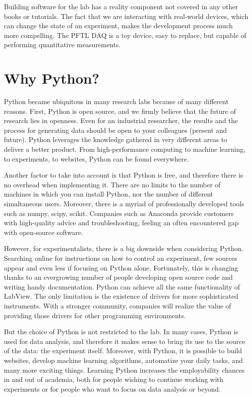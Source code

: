 Building software for the lab has a reality component not covered in any other books or tutorials. The fact that we are interacting with real-world devices, which can change the state of an experiment, makes the development process much more compelling. The PFTL DAQ is a toy device, easy to replace, but capable of performing quantitative measurements.

\section{Why Python?}\label{sec:why-python?}
Python became ubiquitous in many research labs because of many different reasons. First, Python is open source, and we firmly believe that the future of research lies in openness. Even for an industrial researcher, the results and the process for generating data should be open to your colleagues (present and future). Python leverages the knowledge gathered in very different areas to deliver a better product. From high-performance computing to machine learning, to experiments, to websites, Python can be found everywhere.

Another factor to take into account is that Python is free, and therefore there is no overhead when implementing it. There are no limits to the number of machines in which you can install Python, nor the number of different simultaneous users. Moreover, there is a myriad of professionally developed tools such as numpy, scipy, scikit. Companies such as Anaconda provide customers with high-quality advice and troubleshooting, feeling an often encountered gap with open-source software.

However, for experimentalists, there is a big downside when considering Python. Searching online for instructions on how to control an experiment, few sources appear and even less if focusing on Python alone. Fortunately, this is changing thanks to an evergrowing number of people developing open source code and writing handy documentation. Python can achieve all the same functionality of LabView. The only limitation is the existence of drivers for more sophisticated instruments. With a stronger community, companies will realize the value of providing those drivers for other programming environments.

But the choice of Python is not restricted to the lab. In many cases, Python is used for data analysis, and therefore it makes sense to bring its use to the source of the data: the experiment itself. Moreover, with Python, it is possible to build websites, develop machine learning algorithms, automatize your daily tasks, and many more exciting things. Learning Python increases the employability chances in and out of academia, both for people wishing to continue working with experiments or for people who want to focus on data analysis or beyond.

